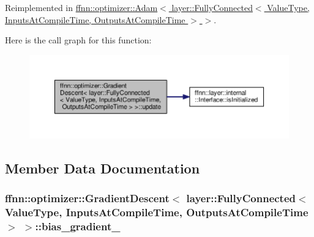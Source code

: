 Reimplemented in \hyperlink{classffnn_1_1optimizer_1_1_adam_3_01layer_1_1_fully_connected_3_01_value_type_00_01_inputs_at_co08ce471fd3ee7441a350cc42cfd35bcd_ad42586e39195fc9a72057f20b657f8be}{ffnn\-::optimizer\-::\-Adam$<$ layer\-::\-Fully\-Connected$<$ Value\-Type, Inputs\-At\-Compile\-Time, Outputs\-At\-Compile\-Time $>$ $>$}.



Here is the call graph for this function\-:
\nopagebreak
\begin{figure}[H]
\begin{center}
\leavevmode
\includegraphics[width=350pt]{classffnn_1_1optimizer_1_1_gradient_descent_3_01layer_1_1_fully_connected_3_01_value_type_00_01_5f7b01db2ae4d39760d70ee323649a60_a4e15c26f4b561a8ea3ca3de3b324e1cf_cgraph}
\end{center}
\end{figure}




\subsection{Member Data Documentation}
\hypertarget{classffnn_1_1optimizer_1_1_gradient_descent_3_01layer_1_1_fully_connected_3_01_value_type_00_01_5f7b01db2ae4d39760d70ee323649a60_ab9e5c3af9ed401ddc36ea6e2437e4e51}{
\subsubsection[{bias\-\_\-gradient\-\_\-}]{ {\bf ffnn\-::optimizer\-::\-Gradient\-Descent}$<$ {\bf layer\-::\-Fully\-Connected}$<$ Value\-Type, Inputs\-At\-Compile\-Time, Outputs\-At\-Compile\-Time $>$ $>$\-::bias\-\_\-gradient\-\_\-\hspace{0.3cm}{\ttfamily [protected]}}}\label{classffnn_1_1optimizer_1_1_gradient_descent_3_01layer_1_1_fully_connected_3_01_value_type_00_01_5f7b01db2ae4d39760d70ee323649a60_ab9e5c3af9ed401ddc36ea6e2437e4e51}


